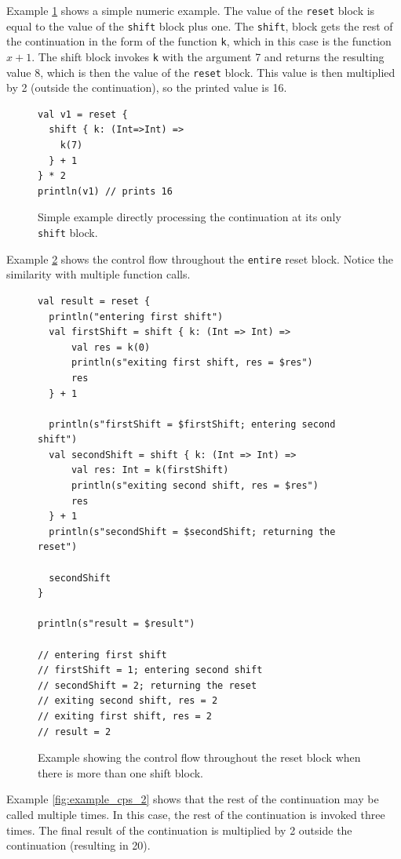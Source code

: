 Example \ref{fig:example_cps_1} shows a simple numeric example. The value of the \texttt{reset} block is equal to the value of the \texttt{shift} block plus one. The \texttt{shift}, block gets the rest of the continuation in the form of the function \texttt{k}, which in this case is the function \(x + 1\). The shift block invokes \texttt{k} with the argument 7 and returns the resulting value 8, which is then the value of the \texttt{reset} block. This value is then multiplied by 2 (outside the continuation), so the printed value is 16.

\begin{figure}[h!] \label{fig:example_cps_1}
\begin{lstlisting}
val v1 = reset {
  shift { k: (Int=>Int) =>
    k(7)
  } + 1
} * 2
println(v1) // prints 16
\end{lstlisting}
\caption{Simple example directly processing the continuation at its only \texttt{shift} block.}
\end{figure}

Example \ref{fig:example_cps_step_by_step} shows the control flow throughout the \texttt{entire} reset block. Notice the similarity with multiple function calls.

\begin{figure}[h!] \label{fig:example_cps_step_by_step}
\begin{lstlisting}
val result = reset {
  println("entering first shift")
  val firstShift = shift { k: (Int => Int) =>
      val res = k(0)
      println(s"exiting first shift, res = $res")
      res
  } + 1

  println(s"firstShift = $firstShift; entering second shift")
  val secondShift = shift { k: (Int => Int) =>
      val res: Int = k(firstShift)
      println(s"exiting second shift, res = $res")
      res
  } + 1
  println(s"secondShift = $secondShift; returning the reset")

  secondShift
}

println(s"result = $result")

// entering first shift
// firstShift = 1; entering second shift
// secondShift = 2; returning the reset
// exiting second shift, res = 2
// exiting first shift, res = 2
// result = 2
\end{lstlisting}
\caption{Example showing the control flow throughout the reset block when there is more than one shift block.}
\end{figure}

Example \ref{fig:example_cps_2} shows that the rest of the continuation may be called multiple times. In this case, the rest of the continuation is invoked three times. The final result of the continuation is multiplied by 2 outside the continuation (resulting in 20).

